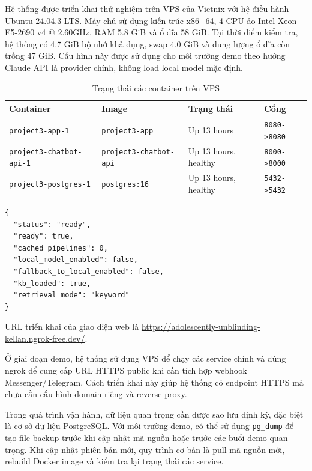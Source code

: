 \documentclass[../DoAn.tex]{subfiles}
\begin{document}
Hệ thống được triển khai thử nghiệm trên VPS của Vietnix với hệ điều hành Ubuntu 24.04.3 LTS. Máy chủ sử dụng kiến trúc x86\_64, 4 CPU ảo Intel Xeon E5-2690 v4 @ 2.60GHz, RAM 5.8 GiB và ổ đĩa 58 GiB. Tại thời điểm kiểm tra, hệ thống có 4.7 GiB bộ nhớ khả dụng, swap 4.0 GiB và dung lượng ổ đĩa còn trống 47 GiB. Cấu hình này được sử dụng cho môi trường demo theo hướng Claude API là provider chính, không load local model mặc định.

\begin{table}[H]
\centering
\caption{Trạng thái các container trên VPS}
\label{tab:ch4-deploy-container-status}
\begin{tabular}{|p{}|p{}|p{}|p{}|}
\hline
\textbf{Container} & \textbf{Image} & \textbf{Trạng thái} & \textbf{Cổng} \\
\hline
\texttt{project3-app-1} & \texttt{project3-app} & Up 13 hours & \texttt{8080->8080} \\
\hline
\texttt{project3-chatbot-api-1} & \texttt{project3-chatbot-api} & Up 13 hours, healthy & \texttt{8000->8000} \\
\hline
\texttt{project3-postgres-1} & \texttt{postgres:16} & Up 13 hours, healthy & \texttt{5432->5432} \\
\hline
\end{tabular}
\end{table}

\begin{verbatim}
{
  "status": "ready",
  "ready": true,
  "cached_pipelines": 0,
  "local_model_enabled": false,
  "fallback_to_local_enabled": false,
  "kb_loaded": true,
  "retrieval_mode": "keyword"
}
\end{verbatim}

URL triển khai của giao diện web là \url{https://adolescently-unblinding-kellan.ngrok-free.dev/}.

Ở giai đoạn demo, hệ thống sử dụng VPS để chạy các service chính và dùng ngrok để cung cấp URL HTTPS public khi cần tích hợp webhook Messenger/Telegram. Cách triển khai này giúp hệ thống có endpoint HTTPS mà chưa cần cấu hình domain riêng và reverse proxy.

Trong quá trình vận hành, dữ liệu quan trọng cần được sao lưu định kỳ, đặc biệt là cơ sở dữ liệu PostgreSQL. Với môi trường demo, có thể sử dụng \texttt{pg\_dump} để tạo file backup trước khi cập nhật mã nguồn hoặc trước các buổi demo quan trọng. Khi cập nhật phiên bản mới, quy trình cơ bản là pull mã nguồn mới, rebuild Docker image và kiểm tra lại trạng thái các service.

\end{document}
